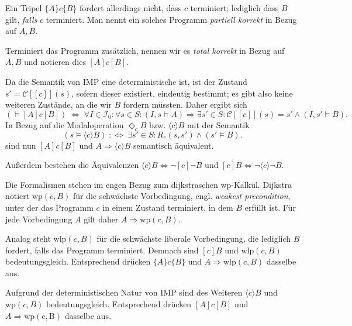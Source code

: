 \documentclass[8pt,fleqn,aspectratio=169]{beamer}
\newcommand{\parspace}{\vspace{0.8em}}
\newcommand{\qb}[1]{[\!\![#1]\!\!]}
\newcommand{\evC}{\mathcal C}
\begin{document}
\begin{frame}
Ein Tripel $\{A\}c\{B\}$ fordert allerdings nicht, dass $c$ terminiert;
lediglich dass $B$ gilt, \emph{falls} $c$ terminiert. Man nennt ein
solches Programm \emph{partiell korrekt} in Bezug auf $A,B$.\pause

\parspace
Terminiert das Programm zusätzlich, nennen wir es \emph{total korrekt}
in Bezug auf $A,B$ und notieren dies $[A]c[B]$.\pause

\parspace
Da die Semantik von IMP eine deterministische ist, ist der Zustand $s'=\evC\qb{c}(s)$,
sofern dieser existiert, eindeutig bestimmt; es gibt also keine weiteren Zustände,
an die wir $B$ fordern müssten. Daher ergibt sich
\[(\models [A]c [B]) \;\Leftrightarrow\; \forall I\in\mathcal I_0\colon\forall s\in S\colon
(I,s\models A)\Rightarrow\exists s'\in S\colon \evC\qb{c}(s)=s'\land (I,s'\models B).\]\pause
In Bezug auf die Modaloperation $\Diamond_c B$ bzw. $\langle c\rangle B$ mit der Semantik
\[(s\models\langle c\rangle B)\;:\Leftrightarrow\; \exists s'\in S\colon R_c(s,s')\land (s'\models B).\]
sind nun $[A]c[B]$ und $A\Rightarrow\langle c\rangle B$ semantisch äquivalent.

\parspace
{\footnotesize Außerdem bestehen die Äquivalenzen
$\langle c\rangle B \Leftrightarrow \lnot [c]\lnot B$
und $[c]B\Leftrightarrow\lnot\langle c\rangle\lnot B$.}
\end{frame}

\begin{frame}
Die Formalismen stehen im engen Bezug zum dijkstraschen wp-Kalkül.
Dijkstra notiert $\mathrm{wp}(c,B)$ für die schwächste Vorbedingung,
engl. \emph{weakest precondition}, unter der das Programm $c$ in einem
Zustand terminiert, in dem $B$ erfüllt ist. Für jede Vorbedingung $A$
gilt daher $A\Rightarrow\mathrm{wp}(c,B)$.\pause

\parspace
Analog steht $\mathrm{wlp}(c,B)$ für die schwächste liberale
Vorbedingung, die lediglich $B$ fordert, falls das Programm terminiert.
Demnach sind $[c]B$ und $\mathrm{wlp}(c,B)$ bedeutungsgleich.
Entsprechend drücken $\{A\}c\{B\}$ und $A\Rightarrow\mathrm{wlp}(c,B)$
dasselbe aus.\pause

\parspace
Aufgrund der deterministischen Natur von IMP sind des Weiteren
$\langle c\rangle B$ und $\mathrm{wp}(c,B)$ bedeutungsgleich.
Entsprechend drücken $[A]c[B]$ und $A\Rightarrow\mathrm{wp(c,B)}$
dasselbe aus.
\end{frame}
\end{document}
